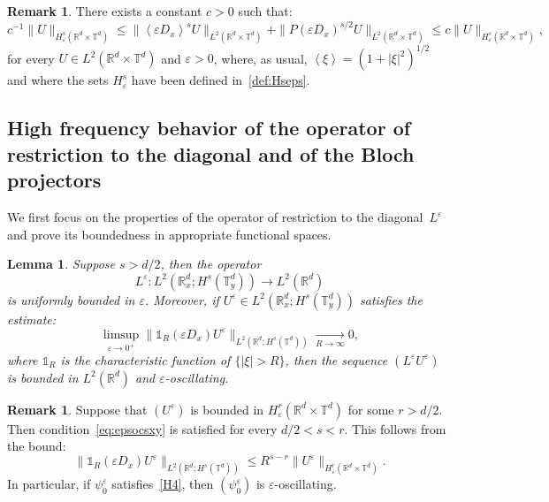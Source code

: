 \documentclass[10pt]{amsart}
\newtheorem{lemm}[cdrthm]{Lemma}
\theoremstyle{definition}
\newtheorem{rema}[cdrthm]{Remark}
\newcommand*\R{{\mathbb R}}
\newcommand*\T{{\mathbb T}}
\newcommand*\eps{\varepsilon}
\newcommand{\To}{\longrightarrow}
\numberwithin{equation}{section}
\def\Tend#1#2{\mathop{\longrightarrow}\limits_{#1\rightarrow#2}}
\begin{document}
\begin{rema}\label{rem:eqnorm}
There exists a constant $c>0$ such that:
\[
c^{-1}\|U\|_{H^s_\eps(\R^d\times\T^d)}\leq \lVert\left\langle\eps D_x\right\rangle^s U\|_{L^2(\R^d\times\T^d)}+\|P(\eps D_x)^{s/2}U\|_{L^2(\R^d\times\T^d)}
\leq c\|U\|_{H^s_\eps(\R^d\times\T^d)},
\]%
for every $U\in L^2(\R^d\times\T^d)$ and $\eps>0$, where, as usual, $\left\langle\xi\right\rangle=(1+|\xi|^2)^{1/2}$ and where the sets $H^s_\eps$ have been defined in~\eqref{def:Hseps}.
\end{rema}

\subsection{High frequency behavior of the operator of restriction to the diagonal and of the Bloch projectors}
We first focus on the properties of the operator of restriction to the diagonal~$L^\eps$ and prove its boundedness in appropriate functional spaces.

\begin{lemm}\label{lem:eoscxy}
Suppose $s>d/2$, then the operator
\[
L^\eps: L^2(\R^d_x;H^s(\T^d_y))\To L^2(\R^d)
\]
is uniformly bounded in $\eps$. 
Moreover, if $U^\eps\in L^2(\R^d_x;H^s(\T^d_y))$ satisfies the estimate:
\begin{equation}\label{eq:epsocsxy}
\limsup_{\eps\to 0^+}\|\mathds{1}_R(\eps D_x)U^\eps\|_{L^2(\R^d;H^s(\T^d))}\Tend{R}{\infty}0,
\end{equation}
where $\mathds{1}_R$ is the characteristic function of $\{|\xi|>R\}$, then the sequence $(L^\eps U^\eps)$ is bounded in $L^2(\R^d)$ and $\eps$-oscillating.
\end{lemm}

\begin{rema}\label{rem:psieps0epsosc}
Suppose that $(U^\eps)$ is bounded in $H^r_\eps(\R^d\times\T^d)$ for some $r>d/2$. Then condition~\eqref{eq:epsocsxy} is satisfied for every $d/2<s<r$. This follows from the bound:
\[
\|\mathds{1}_R(\eps D_x)U^\eps\|_{L^2(\R^d;H^s(\T^d))}\leq R^{s-r}\|U^\eps\|_{H^r_\eps(\R^d\times\T^d)}.
\]
In particular, if $\psi^\eps_0$ satisfies~\eqref{H4}, then $(\psi^\eps_0)$ is $\eps$-oscillating.
\end{rema}
\end{document}
